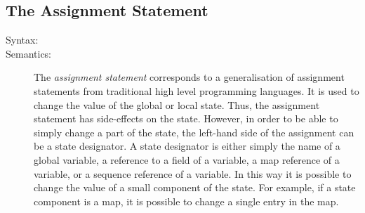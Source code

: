 \documentclass[\pformat,12pt]{article}
\begin{document}
\subsection{The Assignment Statement}

\begin{description}
\item[Syntax:]

%
{}








\item[Semantics:] The {\it assignment statement} corresponds to a
  generalisation of assignment statements from traditional high level
  programming languages. It is used to change the value of the global or
  local state. Thus, the assignment statement has side-effects on the
  state. However, in order to be able to simply change a part of the state,
  the left-hand side of the assignment can be a state designator. A state
  designator is either simply the name of a global variable, a reference to
  a field of a variable, a map reference of a variable, or a sequence
  reference of a variable. In this way it is possible to change the value
  of a small component of the state. For example, if a state component is a
  map, it is possible to change a single entry in the map.


\end{description}
\end{document}
